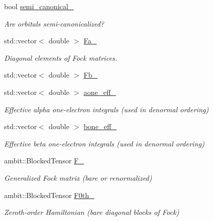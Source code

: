 \begin{DoxyCompactItemize}
bool \mbox{\hyperlink{classforte_1_1_d_s_r_g___m_r_p_t3_a32aa55b38940e86d15b60350ccb636f7}{semi\+\_\+canonical\+\_\+}}
\begin{DoxyCompactList}\small\item\em Are orbitals semi-\/canonicalized? \end{DoxyCompactList}\item 
std\+::vector$<$ double $>$ \mbox{\hyperlink{classforte_1_1_d_s_r_g___m_r_p_t3_afda1234ea7f619908fb0ff10188d0d74}{Fa\+\_\+}}
\begin{DoxyCompactList}\small\item\em Diagonal elements of Fock matrices. \end{DoxyCompactList}\item 
std\+::vector$<$ double $>$ \mbox{\hyperlink{classforte_1_1_d_s_r_g___m_r_p_t3_a469cd21683c1d469f08c7b5c6f4c3f95}{Fb\+\_\+}}
\item 
std\+::vector$<$ double $>$ \mbox{\hyperlink{classforte_1_1_d_s_r_g___m_r_p_t3_af947d5aa4c9aee775d56ad6085e299ac}{aone\+\_\+eff\+\_\+}}
\begin{DoxyCompactList}\small\item\em Effective alpha one-\/electron integrals (used in denormal ordering) \end{DoxyCompactList}\item 
std\+::vector$<$ double $>$ \mbox{\hyperlink{classforte_1_1_d_s_r_g___m_r_p_t3_aed9f088d1f9bcd8facb10dd1569748aa}{bone\+\_\+eff\+\_\+}}
\begin{DoxyCompactList}\small\item\em Effective beta one-\/electron integrals (used in denormal ordering) \end{DoxyCompactList}\item 
ambit\+::\+Blocked\+Tensor \mbox{\hyperlink{classforte_1_1_d_s_r_g___m_r_p_t3_a358a3512d5e25f9830f24df84c03d565}{F\+\_\+}}
\begin{DoxyCompactList}\small\item\em Generalized Fock matrix (bare or renormalized) \end{DoxyCompactList}\item 
ambit\+::\+Blocked\+Tensor \mbox{\hyperlink{classforte_1_1_d_s_r_g___m_r_p_t3_ad529a0f458610f6099d7e2cc47cfd896}{F0th\+\_\+}}
\begin{DoxyCompactList}\small\item\em Zeroth-\/order Hamiltonian (bare diagonal blocks of Fock) \end{DoxyCompactList}\item 

\end{DoxyCompactItemize}
